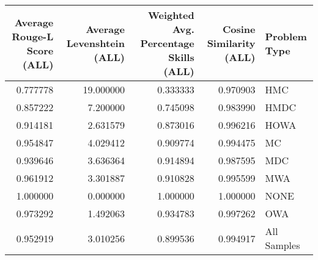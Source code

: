 \begin{tabular}{rrrrl}
\toprule
Average Rouge-L Score (ALL) & Average Levenshtein (ALL) & Weighted Avg. Percentage Skills (ALL) & Cosine Similarity (ALL) & Problem Type \\
\midrule
0.777778 & 19.000000 & 0.333333 & 0.970903 & HMC \\
0.857222 & 7.200000 & 0.745098 & 0.983990 & HMDC \\
0.914181 & 2.631579 & 0.873016 & 0.996216 & HOWA \\
0.954847 & 4.029412 & 0.909774 & 0.994475 & MC \\
0.939646 & 3.636364 & 0.914894 & 0.987595 & MDC \\
0.961912 & 3.301887 & 0.910828 & 0.995599 & MWA \\
1.000000 & 0.000000 & 1.000000 & 1.000000 & NONE \\
0.973292 & 1.492063 & 0.934783 & 0.997262 & OWA \\
0.952919 & 3.010256 & 0.899536 & 0.994917 & All Samples \\
\bottomrule
\end{tabular}
